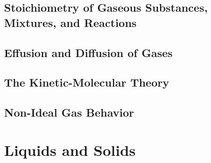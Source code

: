 \documentclass[12pt, openany, letterpaper]{memoir}
\begin{document}
\section{Stoichiometry of Gaseous Substances, Mixtures, and Reactions}

\section{Effusion and Diffusion of Gases}

\section{The Kinetic-Molecular Theory}

\section{Non-Ideal Gas Behavior}

\chapter{Liquids and Solids}
\end{document}
